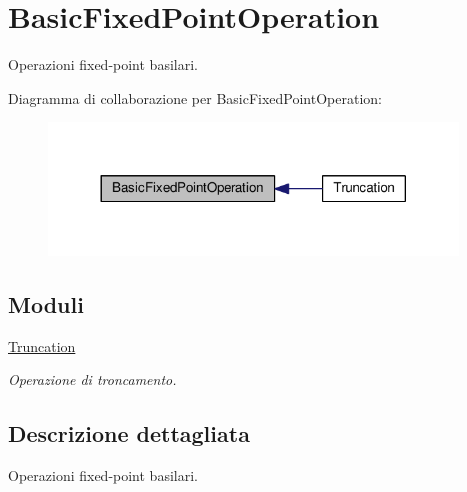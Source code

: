 \hypertarget{group___basic_fixed_point_operation}{\section{Basic\+Fixed\+Point\+Operation}
\label{group___basic_fixed_point_operation}
}


Operazioni fixed-\/point basilari.  


Diagramma di collaborazione per Basic\+Fixed\+Point\+Operation\+:\nopagebreak
\begin{figure}[H]
\begin{center}
\leavevmode
\includegraphics[width=308pt]{group___basic_fixed_point_operation}
\end{center}
\end{figure}
\subsection*{Moduli}
\begin{DoxyCompactItemize}
\item 
\hyperlink{group___truncation}{Truncation}
\begin{DoxyCompactList}\small\item\em Operazione di troncamento. \end{DoxyCompactList}\end{DoxyCompactItemize}


\subsection{Descrizione dettagliata}
Operazioni fixed-\/point basilari. 

